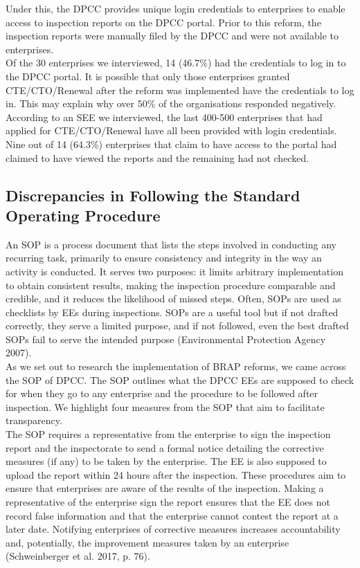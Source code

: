 \documentclass[a4paper, 12pt]{article}
\begin{document}
	Under this, the DPCC provides unique login credentials to enterprises to enable access to inspection reports on the DPCC portal. Prior to this reform, the inspection reports were manually filed by the DPCC and were not available to enterprises. \\
	
	Of the 30 enterprises we interviewed, 14 (46.7\%) had the credentials to log in to the DPCC portal. It is possible that only those enterprises granted CTE/CTO/Renewal after the reform was implemented have the credentials to log in. This may explain why over 50\% of the organisations responded negatively. According to an SEE we interviewed, the last 400-500 enterprises that had applied for CTE/CTO/Renewal have all been provided with login credentials. \\
	
	Nine out of 14 (64.3\%) enterprises that claim to have access to the portal had claimed to have viewed the reports and the remaining had not checked. \\
	
	\subsection{Discrepancies in Following the Standard Operating Procedure}
	
	An SOP is a process document that lists the steps involved in conducting any recurring task, primarily to ensure consistency and integrity in the way an activity is conducted. It serves two purposes: it limits arbitrary implementation to obtain consistent results, making the inspection procedure comparable and credible, and it reduces the likelihood of missed steps. Often, SOPs are used as checklists by EEs during inspections. SOPs are a useful tool but if not drafted correctly, they serve a limited purpose, and if not followed, even the best drafted SOPs fail to serve the intended purpose (Environmental Protection Agency 2007). \\
	
	As we set out to research the implementation of BRAP reforms, we came across the SOP of DPCC. The SOP outlines what the DPCC EEs are supposed to check for when they go to any enterprise and the procedure to be followed after inspection. We highlight four measures from the SOP that aim to facilitate transparency. \\
	
	The SOP requires a representative from the enterprise to sign the inspection report and the inspectorate to send a formal notice detailing the corrective measures (if any) to be taken by the enterprise. The EE is also supposed to upload the report within 24 hours after the inspection. These procedures aim to ensure that enterprises are aware of the results of the inspection. Making a representative of the enterprise sign the report ensures that the EE does not record false information and that the enterprise cannot contest the report at a later date. Notifying enterprises of corrective measures increases accountability and, potentially, the improvement measures taken by an enterprise (Schweinberger et al. 2017, p. 76). \\
	
\end{document}
